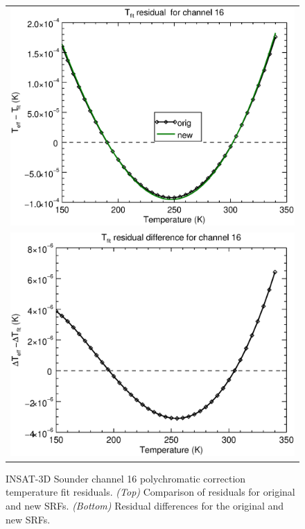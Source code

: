 \begin{figure}[H]
  \centering
  \begin{tabular}{c}
    \includegraphics[scale=0.55]{graphics/sndr/tfit/sndr_insat3d-16.tfit.eps} \\
    \includegraphics[scale=0.55]{graphics/sndr/tfit/sndr_insat3d-16.tfit.difference.eps}
  \end{tabular}
  \caption{INSAT-3D Sounder channel 16 polychromatic correction temperature fit residuals. \emph{(Top)} Comparison of residuals for original and new SRFs. \emph{(Bottom)} Residual differences for the original and new SRFs.}
  \label{fig:sndr_ch16_tfit}
\end{figure}


